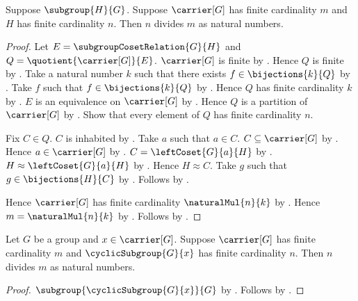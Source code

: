 \begin{theorem}\label{lagrange_finite_cardinality}
    Suppose $\subgroup{H}{G}$.
    Suppose $\carrier[G]$ has finite cardinality $m$ and
        $H$ has finite cardinality $n$.
    Then $n$ divides $m$ as natural numbers.
\end{theorem}
\begin{proof}
    Let $E=\subgroupCosetRelation{G}{H}$ and
        $Q=\quotient{\carrier[G]}{E}$.
    $\carrier[G]$ is finite by .
    Hence $Q$ is finite by .
    Take a natural number $k$ such that there exists
        $f\in\bijections{k}{Q}$ by .
    Take $f$ such that $f\in\bijections{k}{Q}$ by \auto.
    Hence $Q$ has finite cardinality $k$ by
        .
    $E$ is an equivalence on $\carrier[G]$ by
        .
    Hence $Q$ is a partition of $\carrier[G]$ by
        .
    Show that every element of $Q$ has finite cardinality $n$.
    \begin{subproof}
        Fix $C\in Q$.
        $C$ is inhabited by .
        Take $a$ such that $a\in C$.
        $C\subseteq\carrier[G]$ by
            .
        Hence $a\in\carrier[G]$ by .
        $C=\leftCoset{G}{a}{H}$ by
            .
        $H\approx\leftCoset{G}{a}{H}$ by
            .
        Hence $H\approx C$.
        Take $g$ such that $g\in\bijections{H}{C}$ by .
        Follows by .
    \end{subproof}
    Hence $\carrier[G]$ has finite cardinality
        $\naturalMul{n}{k}$ by
        .
    Hence $m=\naturalMul{n}{k}$ by
        .
    Follows by .
\end{proof}

\begin{corollary}\label{cyclic_subgroup_cardinality_divides_group_cardinality}
    Let $G$ be a group and $x\in\carrier[G]$.
    Suppose $\carrier[G]$ has finite cardinality $m$ and
        $\cyclicSubgroup{G}{x}$ has finite cardinality $n$.
    Then $n$ divides $m$ as natural numbers.
\end{corollary}
\begin{proof}
    $\subgroup{\cyclicSubgroup{G}{x}}{G}$ by
        .
    Follows by .
\end{proof}

